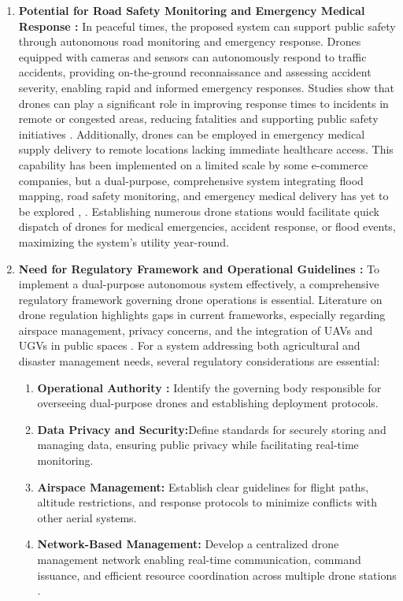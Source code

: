\documentclass[conference]{IEEEtran}
\begin{document}
\begin{enumerate}
	
	\item \textbf{Potential for Road Safety Monitoring and Emergency Medical Response : }
	In peaceful times, the proposed system can support public safety through autonomous road monitoring and emergency response. Drones equipped with cameras and sensors can autonomously respond to traffic accidents, providing on-the-ground reconnaissance and assessing accident severity, enabling rapid and informed emergency responses. Studies show that drones can play a significant role in improving response times to incidents in remote or congested areas, reducing fatalities and supporting public safety initiatives \cite{ref32}. Additionally, drones can be employed in emergency medical supply delivery to remote locations lacking immediate healthcare access. This capability has been implemented on a limited scale by some e-commerce companies, but a dual-purpose, comprehensive system integrating flood mapping, road safety monitoring, and emergency medical delivery has yet to be explored \cite{ref33}, \cite{ref34}. Establishing numerous drone stations would facilitate quick dispatch of drones for medical emergencies, accident response, or flood events, maximizing the system’s utility year-round.
	
	
	\item \textbf{Need for Regulatory Framework and Operational Guidelines : }
	To implement a dual-purpose autonomous system effectively, a comprehensive regulatory framework governing drone operations is essential. Literature on drone regulation highlights gaps in current frameworks, especially regarding airspace management, privacy concerns, and the integration of UAVs and UGVs in public spaces \cite{ref35}. For a system addressing both agricultural and disaster management needs, several regulatory considerations are essential:
	\begin{enumerate}
		\item \textbf{Operational Authority : } Identify the governing body responsible for overseeing dual-purpose drones and establishing deployment protocols.
		\item \textbf{Data Privacy and Security:}Define standards for securely storing and managing data, ensuring public privacy while facilitating real-time monitoring.
		\item \textbf{Airspace Management:} Establish clear guidelines for flight paths, altitude restrictions, and response protocols to minimize conflicts with other aerial systems.
		\item \textbf{Network-Based Management:} Develop a centralized drone management network enabling real-time communication, command issuance, and efficient resource coordination across multiple drone stations \cite{ref36}.
	\end{enumerate}
\end{enumerate}
\end{document}
